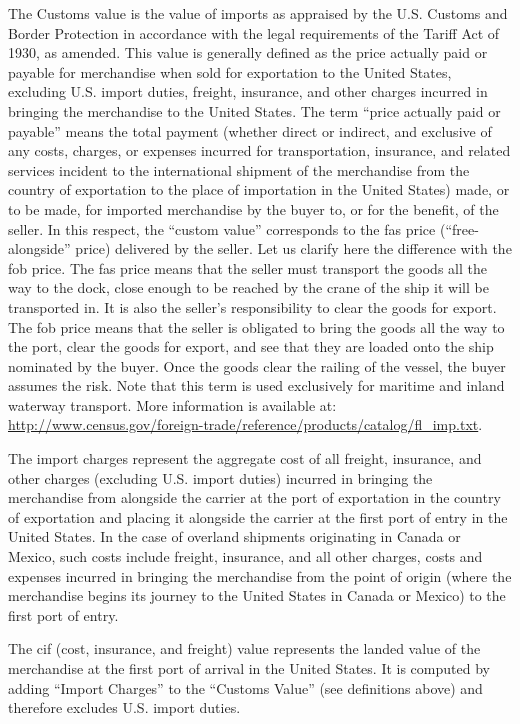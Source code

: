 \documentclass[a4paper,11pt]{article}
\begin{document}
The Customs value is the value of imports as appraised by the U.S.
Customs and Border Protection in accordance with the legal requirements of the Tariff Act of 1930, as amended.
This value is generally defined as the price actually paid or payable for merchandise when sold for exportation to the United States, excluding U.S.
import duties, freight, insurance, and other charges incurred in bringing the merchandise to the United States.
The term ``price actually paid or payable'' means the total payment (whether direct or indirect, and exclusive of any costs, charges, or expenses incurred for transportation, insurance, and related services incident to the international shipment of the merchandise from the country of exportation to the place of importation in the United States) made, or to be made, for imported merchandise by the buyer to, or for the benefit, of the seller.
In this respect, the ``custom value'' corresponds to the fas price (``free-alongside'' price) delivered by the seller. Let us clarify here the difference with the fob price. The fas price means that the seller must transport the goods all the way to the dock, close enough to be reached by the crane of the ship it will be transported in. It is also the seller's responsibility to clear the goods for export. The fob price means that the seller is obligated to bring the goods all the way to the port, clear the goods for export, and see that they are loaded onto the ship nominated by the buyer. Once the goods clear the railing of the vessel, the buyer assumes the risk. Note that this term is used exclusively for maritime and inland waterway transport. More information is available at: \url{http://www.census.gov/foreign-trade/reference/products/catalog/fl_imp.txt}. \smallskip



The import charges represent the aggregate cost of all freight, insurance, and other charges (excluding U.S.
import duties) incurred in bringing the merchandise from alongside the carrier at the port of exportation in the country of exportation and placing it alongside the carrier at the first port of entry in the United States.
In the case of overland shipments originating in Canada or Mexico, such costs include freight, insurance, and all other charges, costs and expenses incurred in bringing the merchandise from the point of origin (where the merchandise begins its journey to the United States in Canada or Mexico) to the first port of entry.

The cif (cost, insurance, and freight) value represents the landed value of the merchandise at the first port of arrival in the United States.
It is computed by adding ``Import Charges'' to the ``Customs Value'' (see definitions above) and therefore excludes U.S.
import duties.
\end{document}
